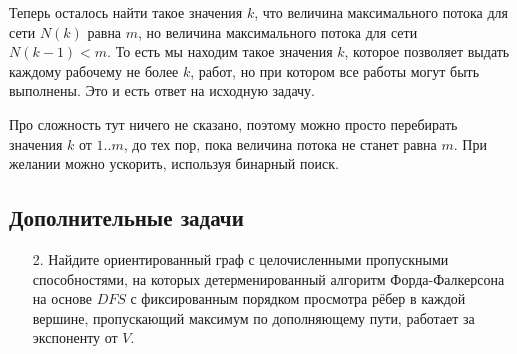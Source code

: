 \begin{enumerate}
	Теперь осталось найти такое значения $k$, что величина максимального потока для сети $N(k)$ равна $m$, но 
	величина максимального потока для сети $N(k - 1) < m$. То есть мы находим такое значения $k$, которое 
	позволяет выдать каждому рабочему не более $k$, работ, но при котором все работы могут быть выполнены. Это и 
	есть ответ на исходную задачу.
	
	Про сложность тут ничего не сказано, поэтому можно просто перебирать значения $k$ от $1..m$, до тех пор, 
	пока величина потока не станет равна $m$. При желании можно ускорить, используя бинарный поиск.
\end{enumerate}

\subsection*{Дополнительные задачи}
\begin{enumerate}
	\item[2.] Найдите ориентированный граф с целочисленными пропускными способностями, на которых детерменированный алгоритм Форда-Фалкерсона на основе $DFS$ с фиксированным порядком просмотра рёбер в каждой вершине, пропускающий максимум по дополняющему пути, работает за экспоненту от $V$.
\end{enumerate}